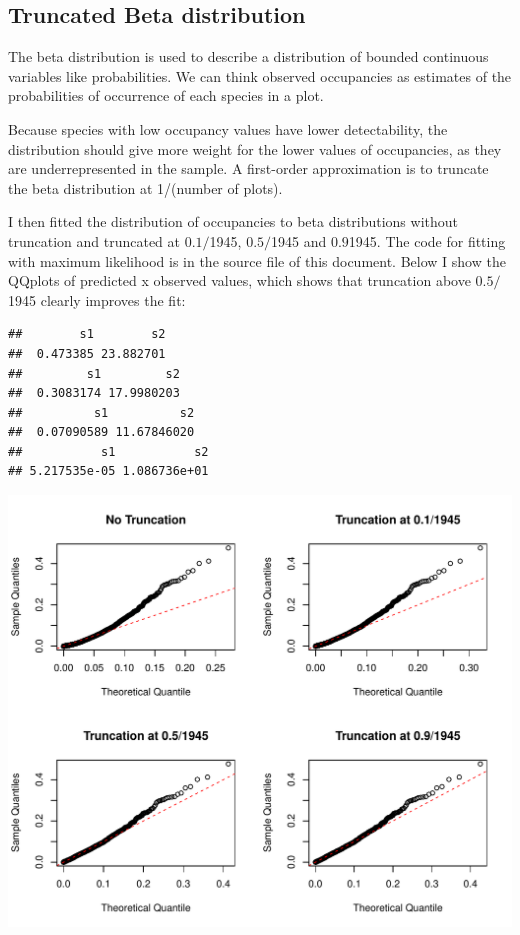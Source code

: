 \documentclass[12pt, A4]{article}\usepackage[]{graphicx}\usepackage[]{color}
\makeatletter
\def\maxwidth{ %
  \ifdim\Gin@nat@width>\linewidth
    \linewidth
  \else
    \Gin@nat@width
  \fi
}
\newenvironment{kframe}{%
 \def\at@end@of@kframe{}%
 \ifinner\ifhmode%
  \def\at@end@of@kframe{\end{minipage}}%
  \begin{minipage}{\columnwidth}%
 \fi\fi%
 \def\FrameCommand##1{\hskip\@totalleftmargin \hskip-\fboxsep
 \colorbox{shadecolor}{##1}\hskip-\fboxsep
     \hskip-\linewidth \hskip-\@totalleftmargin \hskip\columnwidth}%
 \MakeFramed {\advance\hsize-\width
   \@totalleftmargin\z@ \linewidth\hsize
   \@setminipage}}%
 {\par\unskip\endMakeFramed%
 \at@end@of@kframe}
\newenvironment{knitrout}{}{} %
\makeatother
\begin{document}
\subsection*{Truncated Beta distribution}

The beta distribution is used to describe a distribution of bounded
continuous variables like probabilities. We can think observed
occupancies as estimates of the probabilities of occurrence of each species
in a plot. 

Because species with low occupancy values have lower detectability,
the distribution should give more weight for the lower values of occupancies,
as they are underrepresented in the sample. 
A first-order approximation is to truncate the
beta distribution at 1/(number of plots). 

I then fitted the distribution of occupancies to beta distributions
without truncation and truncated at $0.1/$1945, $0.5/$1945 and $0.9$1945.
The code for fitting with maximum likelihood
is in the source file of this document.  
Below I show the QQplots of predicted x observed values,
which shows that truncation above $0.5/$1945 clearly
improves the fit:

\begin{knitrout}
\color{fgcolor}\begin{kframe}
\begin{verbatim}
##        s1        s2 
##  0.473385 23.882701
##         s1         s2 
##  0.3083174 17.9980203
##          s1          s2 
##  0.07090589 11.67846020
##           s1           s2 
## 5.217535e-05 1.086736e+01
\end{verbatim}
\end{kframe}
\end{knitrout}

\begin{knitrout}
\color{fgcolor}

{\centering \includegraphics[width=\maxwidth]{figure/beta_qqplots-1} 

}



\end{knitrout}
\end{document}

